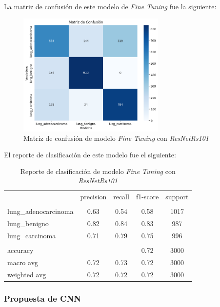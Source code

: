 \newpage

La matriz de confusión de este modelo de \textit{Fine Tuning} fue la siguiente:

\begin{figure}[H]
    \centering
    \includegraphics[width=0.65\textwidth]{Francisco/Imagenes resultados/CMCNN4.png} 
    \caption{Matriz de confusión de modelo \textit{Fine Tuning} con \textit{ResNetRs101}}
\end{figure}

El reporte de clasificación de este modelo fue el siguiente: 

\begin{table}[H]
    \centering
    \begin{tabular}{l c c c c}

         & precision & recall & f1-score & support \\
        \\
        lung\_adenocarcinoma & 0.63 & 0.54 & 0.58 & 1017 \\
        lung\_benigno & 0.82 & 0.84 & 0.83 & 987 \\
        lung\_carcinoma & 0.71 & 0.79 & 0.75 & 996 \\
        \\
        accuracy &  &  & 0.72 & 3000 \\
        macro avg & 0.72 & 0.73 & 0.72 & 3000 \\
        weighted avg & 0.72 & 0.72 & 0.72 & 3000
    
    \end{tabular}
    \caption{Reporte de clasificación de modelo \textit{Fine Tuning} con \textit{ResNetRs101}}
\end{table}

\subsubsection{Propuesta de CNN}

